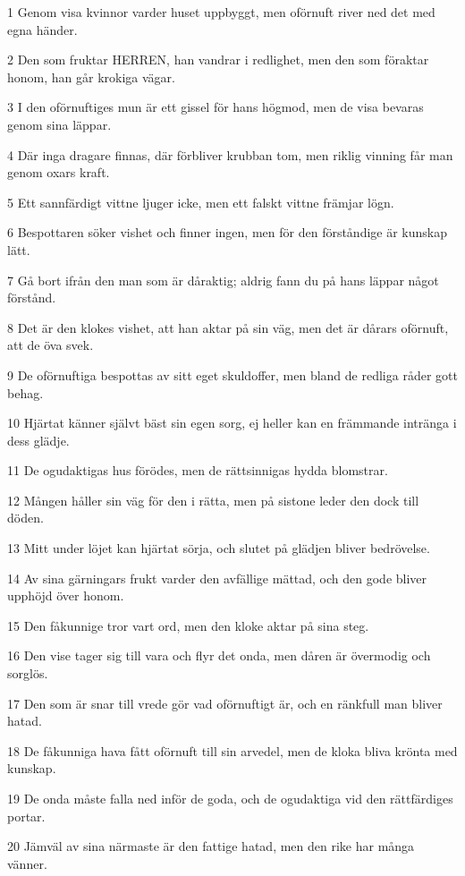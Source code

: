 \par 1 Genom visa kvinnor varder huset uppbyggt, men oförnuft river ned det med egna händer.
\par 2 Den som fruktar HERREN, han vandrar i redlighet, men den som föraktar honom, han går krokiga vägar.
\par 3 I den oförnuftiges mun är ett gissel för hans högmod, men de visa bevaras genom sina läppar.
\par 4 Där inga dragare finnas, där förbliver krubban tom, men riklig vinning får man genom oxars kraft.
\par 5 Ett sannfärdigt vittne ljuger icke, men ett falskt vittne främjar lögn.
\par 6 Bespottaren söker vishet och finner ingen, men för den förståndige är kunskap lätt.
\par 7 Gå bort ifrån den man som är dåraktig; aldrig fann du på hans läppar något förstånd.
\par 8 Det är den klokes vishet, att han aktar på sin väg, men det är dårars oförnuft, att de öva svek.
\par 9 De oförnuftiga bespottas av sitt eget skuldoffer, men bland de redliga råder gott behag.
\par 10 Hjärtat känner självt bäst sin egen sorg, ej heller kan en främmande intränga i dess glädje.
\par 11 De ogudaktigas hus förödes, men de rättsinnigas hydda blomstrar.
\par 12 Mången håller sin väg för den i rätta, men på sistone leder den dock till döden.
\par 13 Mitt under löjet kan hjärtat sörja, och slutet på glädjen bliver bedrövelse.
\par 14 Av sina gärningars frukt varder den avfällige mättad, och den gode bliver upphöjd över honom.
\par 15 Den fåkunnige tror vart ord, men den kloke aktar på sina steg.
\par 16 Den vise tager sig till vara och flyr det onda, men dåren är övermodig och sorglös.
\par 17 Den som är snar till vrede gör vad oförnuftigt är, och en ränkfull man bliver hatad.
\par 18 De fåkunniga hava fått oförnuft till sin arvedel, men de kloka bliva krönta med kunskap.
\par 19 De onda måste falla ned inför de goda, och de ogudaktiga vid den rättfärdiges portar.
\par 20 Jämväl av sina närmaste är den fattige hatad, men den rike har många vänner.
